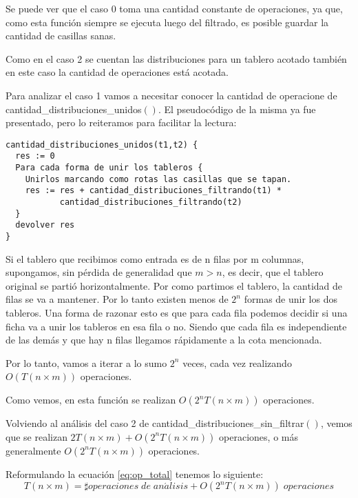 \documentclass[a4paper, 12pt] {article}
\begin{document}
Se puede ver que el caso 0 toma una cantidad constante de operaciones, ya que, como esta funci\'on siempre se ejecuta luego del filtrado, es posible guardar la cantidad de casillas sanas. 

Como en el caso 2 se cuentan las distribuciones para un tablero acotado tambi\'en en este caso la cantidad de operaciones est\'a acotada.

Para analizar el caso 1 vamos a necesitar conocer la cantidad de operacione de cantidad\_distribuciones\_unidos$\left( \right) $.
El pseudoc\'odigo de la misma ya fue presentado, pero lo reiteramos para facilitar la lectura:

\begin{verbatim}
cantidad_distribuciones_unidos(t1,t2) {
  res := 0
  Para cada forma de unir los tableros {
    Unirlos marcando como rotas las casillas que se tapan.
    res := res + cantidad_distribuciones_filtrando(t1) * 
           cantidad_distribuciones_filtrando(t2)
  }
  devolver res
}
\end{verbatim}


Si el tablero que recibimos como entrada es de n filas por m columnas, supongamos, sin p\'erdida de generalidad que $m > n$, es decir, que el tablero original se parti\'o horizontalmente. Por como partimos el tablero, la cantidad de filas se va a mantener. Por lo tanto existen menos de $2^{n}$ formas de unir los dos tableros. Una forma de razonar esto es que para cada fila podemos decidir si una ficha va a unir los tableros en esa fila o no. Siendo que cada fila es independiente de las dem\'as y que hay n filas llegamos r\'apidamente a la cota mencionada.

Por lo tanto, vamos a iterar a lo sumo $2^{n}$ veces, cada vez realizando $ O\left( T\left( n \times m\right) \right) $ operaciones.

Como vemos, en esta funci\'on se realizan $O\left( 2^{n} T\left( n \times m\right) \right) $ operaciones.

Volviendo al an\'alisis del caso 2 de cantidad\_distribuciones\_sin\_filtrar$\left( \right) $, vemos que se realizan $2T\left( n \times m\right) + O\left( 2^{n} T\left( n \times m\right) \right)$ operaciones, o m\'as generalmente $O\left( 2^{n} T\left( n \times m\right) \right)$ operaciones.

Reformulando la ecuaci\'on \ref{eq:op_total} tenemos lo siguiente:
\begin{equation}
 T\left( n \times m\right) = \sharp operaciones\; de\; an\acute{a}lisis + O\left( 2^{n} T\left( n \times m\right) \right) \; operaciones 
\end{equation}
\end{document}
